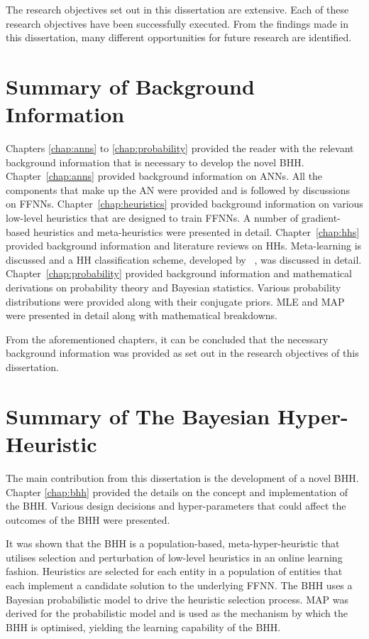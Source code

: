 The research objectives set out in this dissertation are extensive. Each of these research objectives have been successfully executed. From the findings made in this dissertation, many different opportunities for future research are identified.


\section{Summary of Background Information}
\label{sec:conclusion:background_info}

Chapters \ref{chap:anns} to \ref{chap:probability} provided the reader with the relevant background information that is necessary to develop the novel \acs{BHH}. Chapter~\ref{chap:anns} provided background information on \acp{ANN}. All the components that make up the \acs{AN} were provided and is followed by discussions on \acp{FFNN}. Chapter~\ref{chap:heuristics} provided background information on various low-level heuristics that are designed to train \acp{FFNN}. A number of gradient-based heuristics and meta-heuristics were presented in detail. Chapter~\ref{chap:hhs} provided background information and literature reviews on \acp{HH}. Meta-learning is discussed and a \acs{HH} classification scheme, developed by \citeauthor{ref:burke:2010}~\cite{ref:burke:2010}, was discussed in detail. Chapter~\ref{chap:probability} provided background information and mathematical derivations on probability theory and Bayesian statistics. Various probability distributions were provided along with their conjugate priors. \acs{MLE} and \acs{MAP} were presented in detail along with mathematical breakdowns.

From the aforementioned chapters, it can be concluded that the necessary background information was provided as set out in the research objectives of this dissertation.


\section{Summary of The Bayesian Hyper-Heuristic}
\label{sec:conclusion:bhh}

The main contribution from this dissertation is the development of a novel \acf{BHH}. Chapter \ref{chap:bhh} provided the details on the concept and implementation of the \ac{BHH}. Various design decisions and hyper-parameters that could affect the outcomes of the \ac{BHH} were presented.

It was shown that the \acs{BHH} is a population-based, meta-hyper-heuristic that utilises selection and perturbation of low-level heuristics in an online learning fashion. Heuristics are selected for each entity in a population of entities that each implement a candidate solution to the underlying \acs{FFNN}. The \acs{BHH} uses a Bayesian probabilistic model to drive the heuristic selection process. \acs{MAP} was derived for the probabilistic model and is used as the mechanism by which the \acs{BHH} is optimised, yielding the learning capability of the \acs{BHH}.

